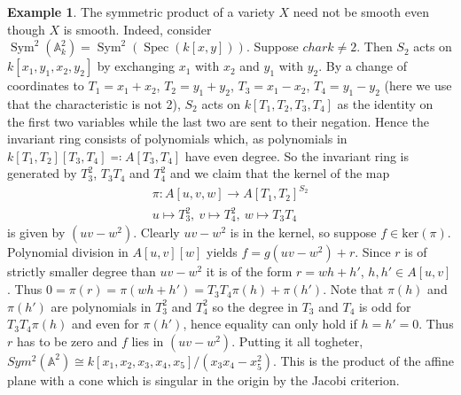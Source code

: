 \documentclass[11pt, a4paper, german, twoside]{article}
\theoremstyle{plain}
\theoremstyle{definition}
\newtheorem{example}[theorem]{Example}
\DeclareMathOperator{\Spec}{Spec}
\DeclareMathOperator{\Sym}{Sym}
\begin{document}
\begin{example}
    The symmetric product of a variety $X$ need not be smooth even though $X$ is smooth. 
    Indeed, consider $\Sym^2(\mathbb{A}_k^2) = \Sym^2(\Spec(k[x,y]))$. Suppose $char k \neq 2$.
    Then $S_2$ acts on $k[x_1,y_1,x_2,y_2]$ by exchanging $x_1$ with $x_2$ and $y_1$ with $y_2$. By a change of coordinates
    to $T_1 = x_1 + x_2$, $T_2 = y_1 + y_2$, $T_3 = x_1 - x_2$, $T_4 = y_1 - y_2$ (here we use that the characteristic is not 2),
    $S_2$ acts on $k[T_1,T_2,T_3,T_4]$ as the identity on the first two variables while the last two are sent to their negation.
    Hence the invariant ring consists of polynomials which, as polynomials in $k[T_1,T_2][T_3,T_4] \eqqcolon A[T_3,T_4]$ have even degree.
    So the invariant ring is generated by $T_3^2$, $T_3T_4$ and $T_4^2$ and we claim that the kernel of the map
    \begin{gather*}
        \pi \colon A[u,v,w] \to A[T_1,T_2]^{S_2}\\
        u \mapsto T_3^2,\ 
        v \mapsto T_4^2,\ 
        w \mapsto T_3T_4
    \end{gather*}
    is given by $(uv - w^2)$. Clearly $uv - w^2$ is in the kernel, so suppose $f \in \mathrm{ker}(\pi)$. 
    Polynomial division in $A[u,v][w]$ yields
    $f = g(uv - w^2) + r$. Since $r$ is of strictly smaller degree than $uv - w^2$ it is of the form $r = wh + h'$, $h, h' \in A[u,v]$.
    Thus $0 = \pi(r) = \pi(wh + h') = T_3T_4\pi(h) + \pi(h')$. 
    Note that $\pi(h)$ and $\pi(h')$ are polynomials in $T_3^2$ and $T_4^2$ so the degree in $T_3$ and $T_4$ is odd for 
    $T_3T_4\pi(h)$ and even for $\pi(h')$,
    hence equality can only hold if $h = h' = 0$. Thus $r$ has to be zero and $f$ lies in $(uv - w^2)$.
    Putting it all togheter, $Sym^2(\mathbb{A}^2) \cong k[x_1,x_2,x_3,x_4,x_5]/(x_3x_4 - x_5^2)$. This is the product of the affine plane with
    a cone which is singular in the origin by the Jacobi
    criterion.


\end{example}
\end{document}
